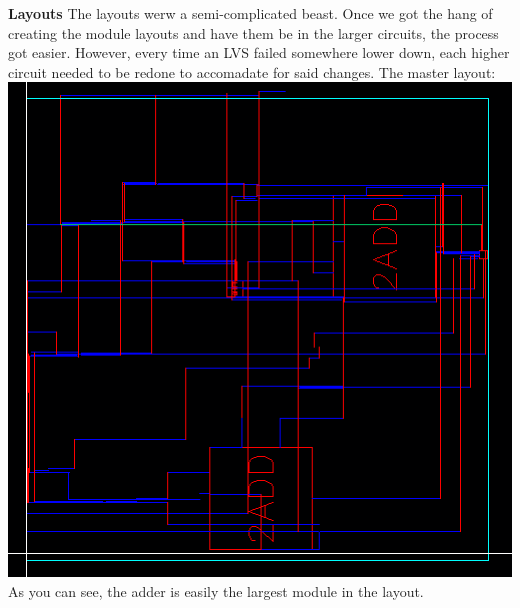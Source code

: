 \documentclass[12pt]{article}
\begin{document}
  \textbf{Layouts}
  \newline \newline
  The layouts werw a semi-complicated beast. Once we got the hang of creating the module layouts
  and have them be in the larger circuits, the process got easier. However, every time an LVS failed
  somewhere lower down, each higher circuit needed to be redone to accomadate for said changes.
  \newline \newline
  The master layout:
  \newline \newline
  \includegraphics[scale=0.5]{masterlayout.png} \\
  \newline \newline
  As you can see, the adder is easily the largest module in the layout. 
  \newline \newline
\end{document}

